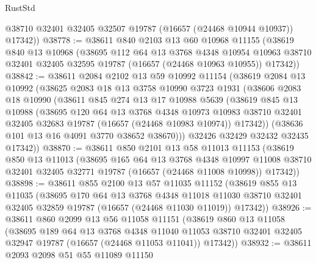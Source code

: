 \begin{lexlean}{RustStd}
\begin{coremodule}
        @38710
        @32401
        @32405
        @32507
        @19787
        (@16657 (@24468 @10944 @10937))
        @17342))
@38778 := @38611
    @840
    @2103
    @13
    @60
    @10968
    @11155
    (@38619
      @840
      @13
      @10968
      (@38695
        @112
        @64
        @13
        @3768
        @4348
        @10954
        @10963
        @38710
        @32401
        @32405
        @32595
        @19787
        (@16657 (@24468 @10963 @10955))
        @17342))
@38842 := @38611
    @2084
    @2102
    @13
    @59
    @10992
    @11154
    (@38619
      @2084
      @13
      @10992
      (@38625
        @2083
        @18
        @13
        @3758
        @10990
        @3723
        @1931
        (@38606
          @2083
          @18
          @10990
          (@38611
            @845
            @274
            @13
            @17
            @10988
            @5639
            (@38619
              @845
              @13
              @10988
              (@38695
                @120
                @64
                @13
                @3768
                @4348
                @10973
                @10983
                @38710
                @32401
                @32405
                @32683
                @19787
                (@16657 (@24468 @10983 @10974))
                @17342))
            (@38636 @101 @13 @16 @4091 @3770 @38652 @38670)))
        @32426
        @32429
        @32432
        @32435
        @17342))
@38870 := @38611
    @850
    @2101
    @13
    @58
    @11013
    @11153
    (@38619
      @850
      @13
      @11013
      (@38695
        @165
        @64
        @13
        @3768
        @4348
        @10997
        @11008
        @38710
        @32401
        @32405
        @32771
        @19787
        (@16657 (@24468 @11008 @10998))
        @17342))
@38898 := @38611
    @855
    @2100
    @13
    @57
    @11035
    @11152
    (@38619
      @855
      @13
      @11035
      (@38695
        @170
        @64
        @13
        @3768
        @4348
        @11018
        @11030
        @38710
        @32401
        @32405
        @32859
        @19787
        (@16657 (@24468 @11030 @11019))
        @17342))
@38926 := @38611
    @860
    @2099
    @13
    @56
    @11058
    @11151
    (@38619
      @860
      @13
      @11058
      (@38695
        @189
        @64
        @13
        @3768
        @4348
        @11040
        @11053
        @38710
        @32401
        @32405
        @32947
        @19787
        (@16657 (@24468 @11053 @11041))
        @17342))
@38932 := @38611 @2093 @2098 @51 @55 @11089 @11150

\end{coremodule}
\end{lexlean}
